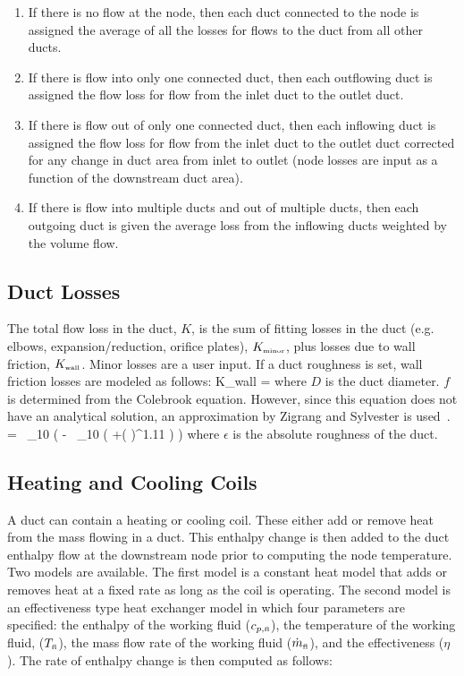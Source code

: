 \begin{enumerate}
\item If there is no flow at the node, then each duct connected to the node is assigned the average of all the losses for flows to the duct from all other ducts.
\item If there is flow into only one connected duct, then each outflowing duct is assigned the flow loss for flow from the inlet duct to the outlet duct.
\item If there is flow out of only one connected duct, then each inflowing duct is assigned the flow loss for flow from the inlet duct to the outlet duct corrected for any change in duct area from inlet to outlet (node losses are input as a function of the downstream duct area).
\item If there is flow into multiple ducts and out of multiple ducts, then each outgoing duct is given the average loss from the inflowing ducts weighted by the volume flow.
\end{enumerate}

\subsection{Duct Losses}

The total flow loss in the duct, $K$, is the sum of fitting losses in the duct (e.g. elbows, expansion/reduction, orifice plates), $K_{\mbox{\tiny minor}}$, plus losses due to wall friction, $K_{\mbox{\tiny wall}}$.  Minor losses are a user input. If a duct roughness is set, wall friction losses are modeled as follows:
\be 
   K_{\mbox{\tiny wall}} =  
\ee
where $D$ is the duct diameter.  $f$ is determined from the Colebrook equation. However, since this equation does not have an analytical solution, an approximation by Zigrang and Sylvester is used~\cite{Zigrang:1}.
\be 
    \; =  \, \log_{10} \left(\; - \;  \, \log_{10} \left( +\left(  \right)^{1.11} \right) \right) 
\ee
where $\epsilon$ is the absolute roughness of the duct.

\subsection{Heating and Cooling Coils}

A duct can contain a heating or cooling coil.  These either add or remove heat from the mass flowing in a duct.  This enthalpy change is then added to the duct enthalpy flow at the downstream node prior to computing the node temperature.  Two models are available.  The first model is a constant heat model that adds or removes heat at a fixed rate as long as the coil is operating.  The second model is an effectiveness type heat exchanger model in which four parameters are specified: the enthalpy of the working fluid ($c_{p,\text{\tiny fl}}$), the temperature of the working fluid, ($T_\text{\tiny fl}$), the mass flow rate of the working fluid ($\dot{m}_\text{\tiny fl}$), and the effectiveness ($\eta$).  The rate of enthalpy change is then computed as follows:

